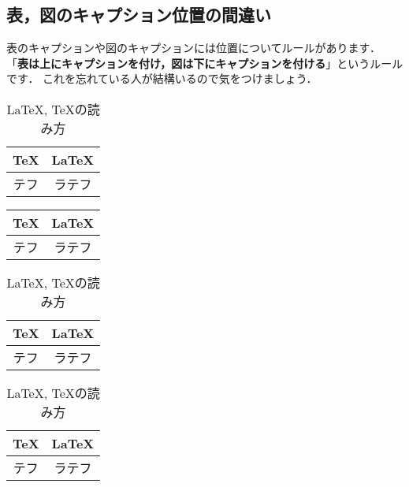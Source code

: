 \documentclass[dvipdfmx,uplatex]{jsarticle}
\begin{document}
{\subsection{表，図のキャプション位置の間違い}
表のキャプションや図のキャプションには位置についてルールがあります．
「{\bfseries 表は上にキャプションを付け，図は下にキャプションを付ける}」というルールです．
これを忘れている人が結構いるので気をつけましょう．
\begin{tcolorbox}[title=キャプション]
\begin{excode}
  \begin{table}[h]
    \centering
    \begin{tabular}{c|c}
      \TeX & \LaTeX \\ \hline
      テフ & ラテフ
    \end{tabular}
    \caption{\LaTeX , \TeX の読み方}
  \end{table}
\end{excode}
\begin{excode}
  \caption{\LaTeX , \TeX の読み方}
  \begin{table}[h]
    \centering
    \begin{tabular}{c|c}
      \TeX & \LaTeX \\ \hline
      テフ & ラテフ
    \end{tabular}
  \end{table}
\end{excode}
\end{tcolorbox}
\begin{table}[h]
\centering
  \begin{minipage}{0.45\columnwidth}
    \centering
    \begin{tabular}{c|c}
      \TeX & \LaTeX \\ \hline
      テフ & ラテフ
    \end{tabular}
    \caption{\LaTeX , \TeX の読み方}
  \end{minipage}
  \begin{minipage}{0.45\columnwidth}
    \centering
    \caption{\LaTeX , \TeX の読み方}
    \begin{tabular}{c|c}
      \TeX & \LaTeX \\ \hline
      テフ & ラテフ
    \end{tabular}
\end{minipage}
\end{table}

}
\end{document}
